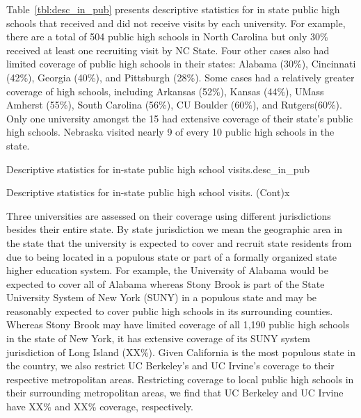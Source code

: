 \documentclass[twoside]{article}
\begin{document}
Table~\ref{tbl:desc_in_pub} presents descriptive statistics for in state public high schools that received and did not receive visits by each university. For example, there are a total of 504 public high schools in North Carolina but only 30\% received at least one recruiting visit by NC State.  Four other cases also had limited coverage of public high schools in their states: Alabama (30\%), Cincinnati (42\%), Georgia (40\%), and Pittsburgh (28\%). Some cases had a relatively greater coverage of high schools, including Arkansas (52\%), Kansas (44\%), UMass Amherst (55\%), South Carolina (56\%), CU Boulder (60\%), and Rutgers(60\%). Only one university amongst the 15 had extensive coverage of their state’s public high schools. Nebraska visited nearly 9 of every 10 public high schools in the state.

\begin{lscape-env}{Descriptive statistics for in-state public high school visits.}{desc_in_pub}
  
\end{lscape-env}

 \begin{lscape-env}{Descriptive statistics for in-state public high school visits. (Cont)}{x}
  
\end{lscape-env}

Three universities are assessed on their coverage using different jurisdictions besides their entire state. By state jurisdiction we mean the geographic area in the state that the university is expected to cover and recruit state residents from due to being located in a populous state or part of a formally organized state higher education system. For example, the University of Alabama would be expected to cover all of Alabama whereas Stony Brook is part of the State University System of New York (SUNY) in a populous state and may be reasonably expected to cover public high schools in its surrounding counties. Whereas Stony Brook may have limited coverage of all 1,190 public high schools in the state of New York, it has extensive coverage of its SUNY system jurisdiction of Long Island (XX\%). Given California is the most populous state in the country, we also restrict UC Berkeley's and UC Irvine's coverage to their respective metropolitan areas. Restricting coverage to local public high schools in their surrounding metropolitan areas, we find that UC Berkeley and UC Irvine have XX\% and XX\% coverage, respectively.
\end{document}
